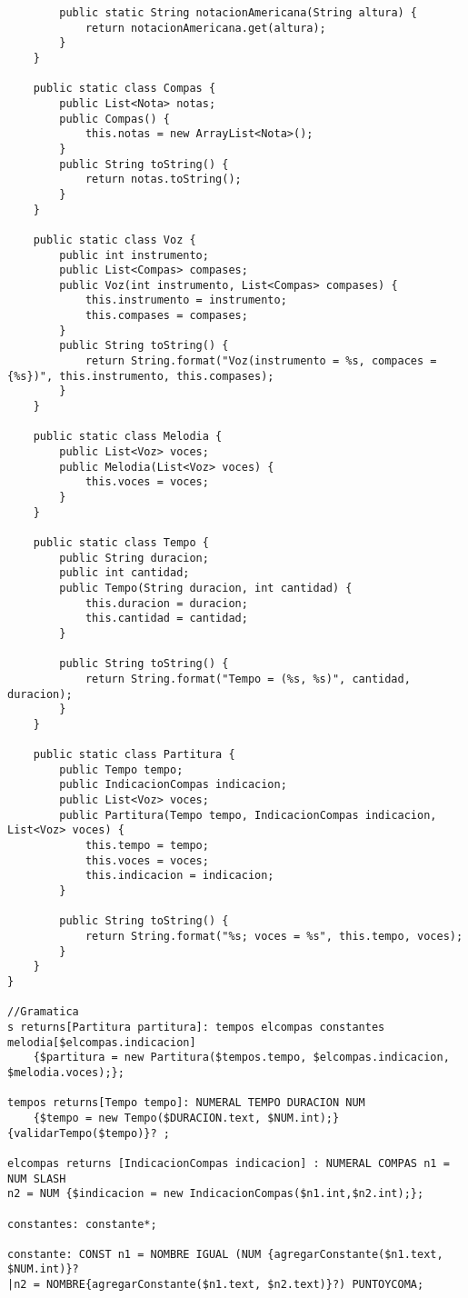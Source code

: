 \begin{verbatim}
		public static String notacionAmericana(String altura) {
			return notacionAmericana.get(altura);
		}
	}
	
	public static class Compas {
		public List<Nota> notas;
		public Compas() {
			this.notas = new ArrayList<Nota>();
		}
		public String toString() {
			return notas.toString();
		}
	}
	
	public static class Voz {
		public int instrumento;
		public List<Compas> compases;
		public Voz(int instrumento, List<Compas> compases) {
			this.instrumento = instrumento;
			this.compases = compases;
		}
		public String toString() {
			return String.format("Voz(instrumento = %s, compaces = {%s})", this.instrumento, this.compases);
		}
	}
	
	public static class Melodia {
		public List<Voz> voces;
		public Melodia(List<Voz> voces) {
			this.voces = voces;
		}
	}
	
	public static class Tempo {
		public String duracion;
		public int cantidad;
		public Tempo(String duracion, int cantidad) {
			this.duracion = duracion;
			this.cantidad = cantidad;
		}
		
		public String toString() {
			return String.format("Tempo = (%s, %s)", cantidad, duracion);
		}
	}
	
	public static class Partitura {
		public Tempo tempo;
		public IndicacionCompas indicacion;
		public List<Voz> voces;
		public Partitura(Tempo tempo, IndicacionCompas indicacion, List<Voz> voces) {
			this.tempo = tempo;
			this.voces = voces;
			this.indicacion = indicacion;
		}
		
		public String toString() {
			return String.format("%s; voces = %s", this.tempo, voces);
		}
	}
}

//Gramatica 
s returns[Partitura partitura]: tempos elcompas constantes melodia[$elcompas.indicacion] 
	{$partitura = new Partitura($tempos.tempo, $elcompas.indicacion, $melodia.voces);};

tempos returns[Tempo tempo]: NUMERAL TEMPO DURACION NUM 
	{$tempo = new Tempo($DURACION.text, $NUM.int);}{validarTempo($tempo)}? ;

elcompas returns [IndicacionCompas indicacion] : NUMERAL COMPAS n1 = NUM SLASH 	
n2 = NUM {$indicacion = new IndicacionCompas($n1.int,$n2.int);};

constantes: constante*;

constante: CONST n1 = NOMBRE IGUAL (NUM {agregarConstante($n1.text, $NUM.int)}?
|n2 = NOMBRE{agregarConstante($n1.text, $n2.text)}?) PUNTOYCOMA;


\end{verbatim}
